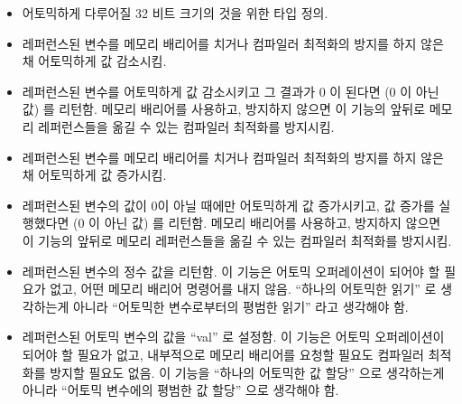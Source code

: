 \begin{itemize}
\item	{}
	어토믹하게 다루어질 32 비트 크기의 것을 위한 타입 정의.
\item	{}
	레퍼런스된 변수를 메모리 배리어를 치거나 컴파일러 최적화의 방지를 하지
	않은 채 어토믹하게 값 감소시킴.
\item	{}
	레퍼런스된 변수를 어토믹하게 값 감소시키고 그 결과가 0 이 된다면
	 (0 이 아닌 값) 를 리턴함.
	메모리 배리어를 사용하고, 방지하지 않으면 이 기능의 앞뒤로 메모리
	레퍼런스들을 옮길 수 있는 컴파일러 최적화를 방지시킴.
\item	{}
	레퍼런스된 변수를 메모리 배리어를 치거나 컴파일러 최적화의 방지를 하지
	않은 채 어토믹하게 값 증가시킴.
\item	{}
	레퍼런스된 변수의 값이 0이 아닐 때에만 어토믹하게 값 증가시키고, 값
	증가를 실행했다면  (0 이 아닌 값) 를 리턴함.
	메모리 배리어를 사용하고, 방지하지 않으면 이 기능의 앞뒤로 메모리
	레퍼런스들을 옮길 수 있는 컴파일러 최적화를 방지시킴.

\item	{}
	레퍼런스된 변수의 정수 값을 리턴함.
	이 기능은 어토믹 오퍼레이션이 되어야 할 필요가 없고, 어떤 메모리 배리어
	명령어를 내지 않음.
	``하나의 어토믹한 읽기'' 로 생각하는게 아니라 ``어토믹한 변수로부터의
	평범한 읽기'' 라고 생각해야 함.
\item	{}
	레퍼런스된 어토믹 변수의 값을 ``val'' 로 설정함.
	이 기능은 어토믹 오퍼레이션이 되어야 할 필요가 없고, 내부적으로 메모리
	배리어를 요청할 필요도 컴파일러 최적화를 방지할 필요도 없음.
	이 기능을 ``하나의 어토믹한 값 할당'' 으로 생각하는게 아니라 ``어토믹
	변수에의 평범한 값 할당'' 으로 생각해야 함.
\iffalse


\end{itemize}
